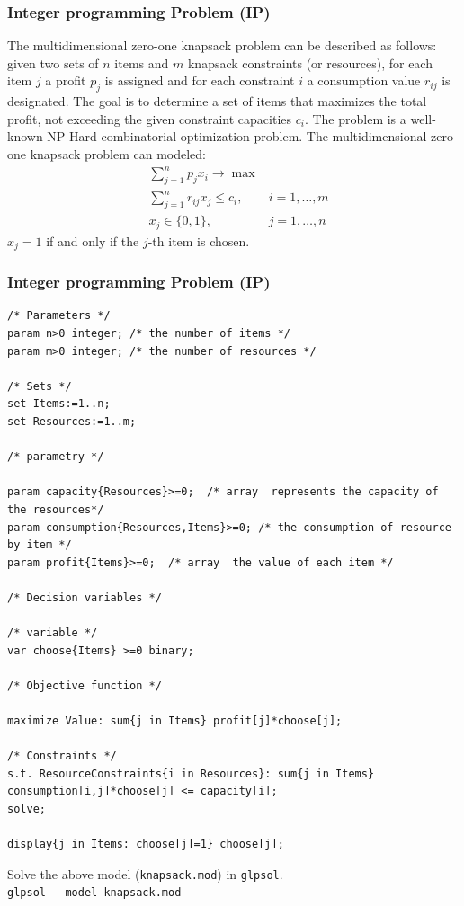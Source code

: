 \documentclass[landscape]{beamer}
\begin{document}
\begin{frame}[fragile]
  \frametitle{Integer programming Problem (IP)}
\begin{small}  
The multidimensional zero-one knapsack problem
can be described as follows: given two sets of $n$ items and $m$
 knapsack constraints (or resources), for each item $j$ a profit $p_j$ is assigned and for each constraint $i$ a consumption value $r_{ij}$ is designated. 
 The goal is to determine a set of items that maximizes the total profit, not exceeding the given constraint capacities $c_i$.
 The problem  is a well-known NP-Hard combinatorial optimization problem.
  The multidimensional zero-one knapsack problem can modeled:
 \begin{align*}
       &\sum_{j=1}^{n}p_j x_i\rightarrow \max&\\
      &\sum_{j=1}^{n} r_{ij} x_j\leq c_i , &i=1,\ldots,m\\
      &x_j \in\{0,1\}, &j=1,\ldots,n
 \end{align*}
 $x_j = 1$ if and only if the $j$-th item is chosen.
\end{small} 
\end{frame}


\begin{frame}[fragile]
  \frametitle{Integer programming Problem (IP)}
\begin{tiny}
\begin{verbatim}
/* Parameters */
param n>0 integer; /* the number of items */
param m>0 integer; /* the number of resources */

/* Sets */
set Items:=1..n; 
set Resources:=1..m;

/* parametry */

param capacity{Resources}>=0;  /* array  represents the capacity of the resources*/
param consumption{Resources,Items}>=0; /* the consumption of resource  by item */
param profit{Items}>=0;  /* array  the value of each item */

/* Decision variables */

/* variable */
var choose{Items} >=0 binary;

/* Objective function */

maximize Value: sum{j in Items} profit[j]*choose[j];

/* Constraints */
s.t. ResourceConstraints{i in Resources}: sum{j in Items} consumption[i,j]*choose[j] <= capacity[i];
solve;

display{j in Items: choose[j]=1} choose[j];
\end{verbatim}
\end{tiny}
\begin{small}
Solve the above model (\texttt{knapsack.mod}) in \texttt{glpsol}.\\
\verb=glpsol --model knapsack.mod=
\end{small}
\end{frame}
\end{document}
